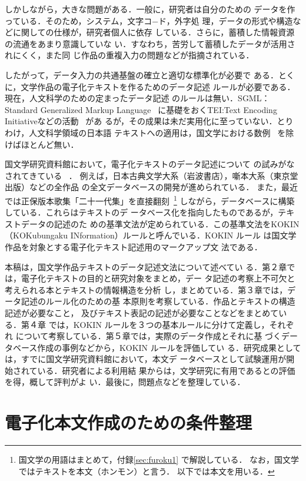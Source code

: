 しかしながら，大きな問題がある．一般に，研究者は自分のための
データを作っている．そのため，システム，文字コ−ド，外字処
理，データの形式や構造などに関しての仕様が，研究者個人に依存
している．さらに，蓄積した情報資源の流通をあまり意識していな
い．すなわち，苦労して蓄積したデータが活用されにくく，また同
じ作品の重複入力の問題などが指摘されている．

したがって，データ入力の共通基盤の確立と適切な標準化が必要で
ある．とくに，文学作品の電子化テキストを作るためのデータ記述
ルールが必要である．現在，人文科学のための定まったデータ記述
のルールは無い．SGML：Standard Generalized Markup Language~\cite{JIS:94}
に基礎をおくTEI:Text Encoding Initiativeなどの活動~\cite{burnard:94} があ
るが，その成果は未だ実用化に至っていない．とりわけ，人文科学領域の日本語
テキストへの適用は，国文学における数例~\cite{hara:95} を除けばほとんど無い．

国文学研究資料館において，電子化テキストのデータ記述について
の試みがなされてきている
~\cite{yasunaga:92,yasunaga:94,yasunaga:95b,kokubun:92}．
例えば，日本古典文学大系（岩波書店），噺本大系（東京堂出版）などの全作品
の全文データベースの開発が進められている．
また，最近では正保版本歌集「二十一代集」を直接翻刻~\footnote{
  国文学の用語はまとめて，付録\ref{sec:furoku1} で解説している．
  なお，国文学ではテキストを本文（ホンモン）と言う．
  以下では本文を用いる．}
しながら，データベースに構築している．これらはテキストのデ
ータベース化を指向したものであるが，テキストデータの記述のた
めの基準文法が定められている．この基準文法をKOKIN
（KOKubungaku INformation）ルールと呼んでいる．KOKIN ルール
は国文学作品を対象とする電子化テキスト記述用のマークアップ文
法である．

本稿は，国文学作品テキストのデータ記述文法について述べてい
る．第２章では，電子化テキストの目的と研究対象をまとめ，デー
タ記述の考察上不可欠と考えられる本とテキストの情報構造を分析
し，まとめている．第３章では，データ記述のルール化のための基
本原則を考察している．作品とテキストの構造記述が必要なこと，
及びテキスト表記の記述が必要なことなどをまとめている．第４章
では，KOKIN ルールを３つの基本ルールに分けて定義し，それぞれ
について考察している．第５章では，実際のデータ作成とそれに基
づくデータベース作成の事例などから，KOKIN ルールを評価してい
る．研究成果としては，すでに国文学研究資料館において，本文デ
ータベースとして試験運用が開始されている．研究者による利用結
果からは，文学研究に有用であるとの評価を得，概して評判がよ
い．最後に，問題点などを整理している．

\section{電子化本文作成のための条件整理}
\label{sec:2shou}

